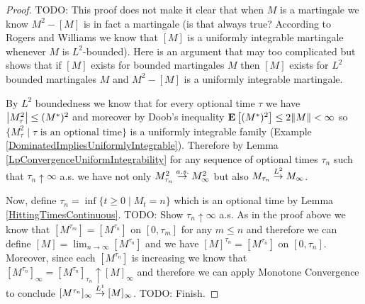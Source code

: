\begin{proof}
TODO: This proof does not make it clear that when $M$ is a martingale we know $M^2 - [M]$ is in fact a martingale (is that always true?  According to Rogers and Williams we know that $[M]$ is a uniformly integrable martingale whenever $M$ is $L^2$-bounded).  Here is an argument that may too complicated but shows that if $[M]$ exists for bounded martingales $M$ then $[M]$ exists for $L^2$ bounded martingales $M$ and $M^2 - [M]$ is a uniformly integrable martingale.

By $L^2$ boundedness we know that for every optional time $\tau$ we have $\left \vert M^2_\tau \right \vert \leq (M^*)^2$ and moreover by Doob's inequality $\textbf{E}\left[(M^*)^2\right] \leq 2 \lVert M \rVert < \infty$ so $\lbrace M^2_\tau \mid \tau \text{ is an optional time}\rbrace$ is a uniformly integrable family (Example \ref{DominatedImpliesUniformlyIntegrable}).  Therefore by Lemma \ref{LpConvergenceUniformIntegrability} for any sequence of optional times $\tau_n$ such that $\tau_n \uparrow \infty$ a.s. we have not only $M^2_{\tau_n} \overset{a.s.}\to M^2_\infty$ but also $M_{\tau_n} \overset{L^2}\to M_\infty$.

Now, define $\tau_n = \inf \lbrace t \geq 0 \mid M_t = n \rbrace$ which is an optional time by Lemma \ref{HittingTimesContinuous}.  TODO: Show $\tau_n \uparrow \infty$ a.s.  As in the proof above we know that $[M^{\tau_m}] = [M^{\tau_n}]$ on $[0,\tau_m]$ for any $m \leq n$ and therefore we can define $[M] = \lim_{n \to \infty} [M^{\tau_n}]$ and we have $[M]^{\tau_n} = [M^{\tau_n}]$ on $[0,\tau_n]$.  Moreover, since each $[M^{\tau_n}]$ is increasing we know that $[M^{\tau_n}]_\infty = [M^{\tau_n}]_{\tau_n} \uparrow [M]_\infty$ and therefore we can apply Monotone Convergence to conclude $[M^{\tau_n}]_\infty \overset{L^1}\to [M]_\infty$.  TODO: Finish.
\end{proof}

